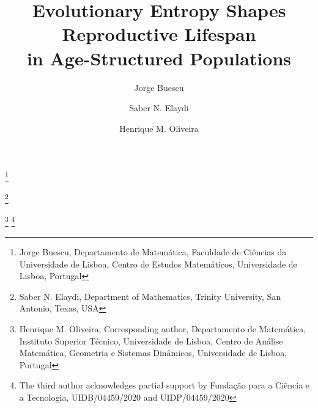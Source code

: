 \documentclass[10pt,a4paper]{amsart}
\theoremstyle{definition}
\theoremstyle{remark}
\numberwithin{equation}{section}
\begin{document}

\title[Evolutionary Entropy Shapes Reproductive Lifespan]
{Evolutionary Entropy Shapes Reproductive Lifespan \\ in Age-Structured Populations}

\author[J. Buescu]{Jorge Buescu}
\thanks{Jorge Buescu, Departamento de Matemática, Faculdade de Ciências da Universidade de Lisboa, Centro de Estudos Matemáticos, Universidade de Lisboa, Portugal}


\author[S. N. Elaydi]{Saber N. Elaydi}
\thanks{Saber N. Elaydi, Department of Mathematics, Trinity University, San Antonio, Texas, USA}

\author[H. M. Oliveira]{Henrique M. Oliveira}
\thanks{Henrique M. Oliveira, Corresponding author, Departamento de Matemática, Instituto Superior Técnico, Universidade de Lisboa, Centro de Análise Matemática, Geometria e Sistemas Dinâmicos, Universidade de Lisboa, Portugal}
\thanks{The third author acknowledges partial support by Fundação para a Ciência e a Tecnologia, UIDB/04459/2020 and UIDP/04459/2020}




\date{}

\end{document}
